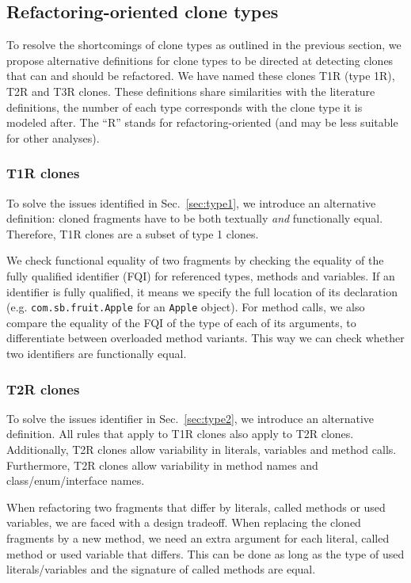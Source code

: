 \documentclass[a4paper]{article}
\begin{document}
\subsection{Refactoring-oriented clone types}\label{sec:rtypes}
To resolve the shortcomings of clone types as outlined in the previous section, we propose alternative definitions for clone types to be directed at detecting clones that can and should be refactored. We have named these clones T1R (type 1R), T2R and T3R clones. These definitions share similarities with the literature definitions, the number of each type corresponds with the clone type it is modeled after. The ``R'' stands for refactoring-oriented (and may be less suitable for other analyses).

\subsubsection{T1R clones} \label{sec:type1r}
To solve the issues identified in Sec.~\ref{sec:type1}, we introduce an alternative definition: cloned fragments have to be both textually \textit{and} functionally equal. Therefore, T1R clones are a subset of type 1 clones.

We check functional equality of two fragments by checking the equality of the fully qualified identifier (FQI) for referenced types, methods and variables. If an identifier is fully qualified, it means we specify the full location of its declaration (e.g. \texttt{com.sb.fruit.Apple} for an \texttt{Apple} object). For method calls, we also compare the equality of the FQI of the type of each of its arguments, to differentiate between overloaded method variants. This way we can check whether two identifiers are functionally equal.

\subsubsection{T2R clones}\label{sec:type2r}
To solve the issues identifier in Sec.~\ref{sec:type2}, we introduce an alternative definition. All rules that apply to T1R clones also apply to T2R clones. Additionally, T2R clones allow variability in literals, variables and method calls. Furthermore, T2R clones allow variability in method names and class/enum/interface names.

When refactoring two fragments that differ by literals, called methods or used variables, we are faced with a design tradeoff. When replacing the cloned fragments by a new method, we need an extra argument for each literal, called method or used variable that differs. This can be done as long as the type of used literals/variables and the signature of called methods are equal.
\end{document}
